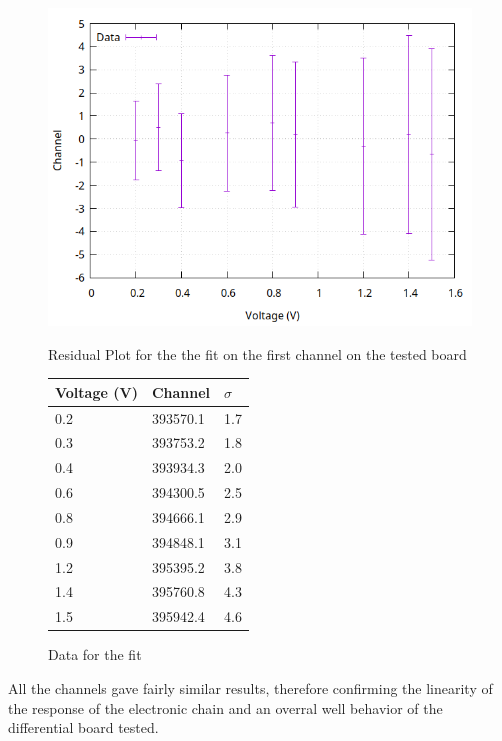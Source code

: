 \begin{figure}[th]
  \centering
  \begin{minipage}[b]{0.45\textwidth}
    \includegraphics[width=\textwidth]{img/first_board_line/data_2/calib_1.png}
    \caption{Residual Plot for the the fit on the first channel on the tested board}
    \label{calib:plot:1}
  \end{minipage}
  \hfill
  \begin{minipage}[b]{0.45\textwidth}
  \begin{tabular}{lll}
    Voltage (V) & Channel & $\sigma$ \\
    \midrule
    0.2 & \num{393570.1} & 1.7 \\
    0.3 & \num{393753.2} & 1.8 \\
    0.4 & \num{393934.3} & 2.0 \\
    0.6 & \num{394300.5} & 2.5 \\
    0.8 & \num{394666.1} & 2.9 \\
    0.9 & \num{394848.1} & 3.1 \\
    1.2 & \num{395395.2} & 3.8 \\
    1.4 & \num{395760.8} & 4.3 \\
    1.5 & \num{395942.4} & 4.6 \\
    \bottomrule
  \end{tabular}
  \caption{Data for the fit}
  \label{calib:1}
  \end{minipage}
\end{figure}

All the channels gave fairly similar results, therefore confirming the linearity of the response of the electronic chain and an overral well behavior of the differential board tested.

